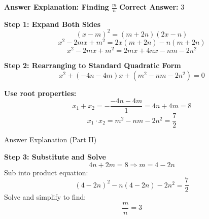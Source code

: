 \documentclass{beamer}
\begin{document}
\begin{frame}{\textbf{Answer Explanation: Finding \( \frac{m}{n} \)}}
\small
    \textbf{Correct Answer:} \textcolor{novelPurple}{\(\boxed{3}\)}

    \vspace{0.3cm}
    \textbf{Step 1: Expand Both Sides}
    \[
    (x - m)^2 = (m + 2n)(2x - n)
    \]
    \[
    x^2 - 2mx + m^2 = 2x(m + 2n) - n(m + 2n)
    \]
    \[
    x^2 - 2mx + m^2 = 2mx + 4nx - nm - 2n^2
    \]

    \vspace{0.3cm}
    \textbf{Step 2: Rearranging to Standard Quadratic Form}
    \[
    x^2 + (-4n - 4m)x + (m^2 - nm - 2n^2) = 0
    \]

    \textbf{Use root properties:}
    \[
    x_1 + x_2 = -\frac{-4n - 4m}{1} = 4n + 4m = 8
    \]
    \[
    x_1 \cdot x_2 = m^2 - nm - 2n^2 = \frac{7}{2}
    \]

\end{frame}

\begin{frame}{Answer Explanation (Part II)}


    \vspace{0.2cm}
    \textbf{Step 3: Substitute and Solve}
    \[
    4n + 2m = 8 \Rightarrow m = 4 - 2n
    \]
    Sub into product equation:
    \[
    (4 - 2n)^2 - n(4 - 2n) - 2n^2 = \frac{7}{2}
    \]
    Solve and simplify to find:
    \[
    \frac{m}{n} = \boxed{3}
    \]
    
\end{frame}
\end{document}

